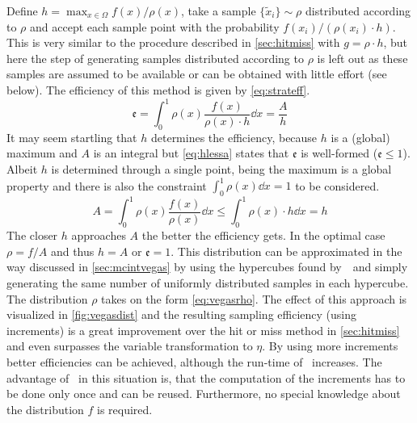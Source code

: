 Define \(h=\max_{x\in\Omega}f(x)/\rho(x)\), take a sample
\(\{\tilde{x}_i\}\sim\rho\) distributed according to \(\rho\) and
accept each sample point with the probability
\(f(x_i)/(\rho(x_i)\cdot h)\).  This is very similar to the procedure
described in \cref{sec:hitmiss} with \(g=\rho\cdot h\), but here the
step of generating samples distributed according to \(\rho\) is left
out as these samples are assumed to be available or can be obtained
with little effort (see below). The efficiency of this method is given
by \cref{eq:strateff}.
%
\begin{equation}
  \label{eq:strateff}
  \mathfrak{e} = \int_0^1\rho(x)\frac{f(x)}{\rho(x)\cdot h}\dd{x} = \frac{A}{h}
\end{equation}
%
It may seem startling that \(h\) determines the efficiency, because
\(h\) is a (global) maximum and \(A\) is an integral
but \cref{eq:hlessa} states that \(\mathfrak{e}\) is well-formed
(\(\mathfrak{e}\leq 1\)). Albeit \(h\) is determined through a single
point, being the maximum is a global property and there is also the
constraint \(\int_0^1\rho(x)\dd{x}=1\) to be considered.
%
\begin{equation}
  \label{eq:hlessa}
  A = \int_0^1\rho(x)\frac{f(x)}{\rho(x)}\dd{x} \leq
  \int_0^1\rho(x)\cdot h\dd{x} = h
\end{equation}
%
The closer \(h\) approaches \(A\) the better the efficiency gets. In
the optimal case \(\rho=f/A\) and thus \(h=A\) or
\(\mathfrak{e} = 1\). This distribution can be approximated in the way
discussed in \cref{sec:mcintvegas} by using the hypercubes found
by~\vegas\ and simply generating the same number of uniformly
distributed samples in each hypercube. The distribution \(\rho\) takes
on the form \cref{eq:vegasrho}. The effect of this approach is
visualized in \cref{fig:vegasdist} and the resulting sampling
efficiency  (using
 increments) is a great
improvement over the hit or miss method in \cref{sec:hitmiss} and even
surpasses the variable transformation to \(\eta\). By using more
increments better efficiencies can be achieved, although the run-time
of \vegas\ increases. The advantage of \vegas\ in this situation is,
that the computation of the increments has to be done only once and
can be reused. Furthermore, no special knowledge about the
distribution \(f\) is required.
%
